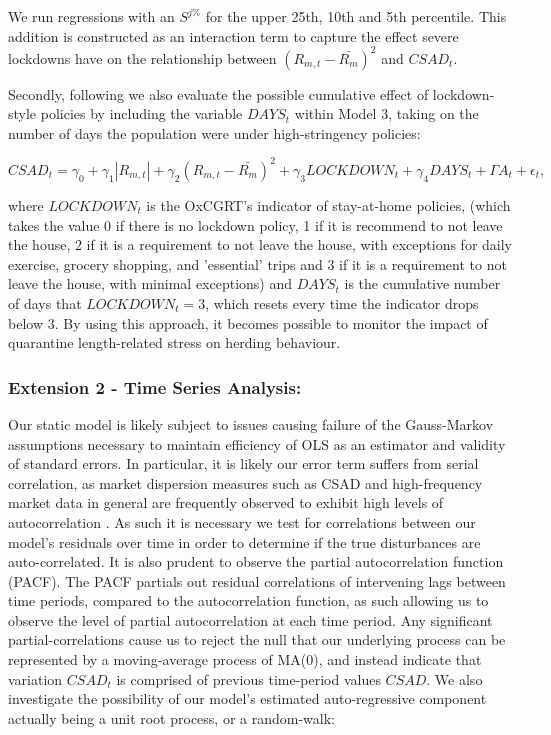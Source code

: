 \documentclass[12pt]{article}
\numberwithin{table}{section}   %
\begin{document}
We run regressions with an $S^{j\%}$ for the upper 25th, 10th and 5th percentile. This addition is constructed as an interaction term to capture the effect severe lockdowns have on the relationship between $(R_{m,t}-\bar{R_m})^2$ and $CSAD_t$.

Secondly, following \citet{aknin} we also evaluate the possible cumulative effect of lockdown-style policies by including the variable $DAYS_t$ within Model 3, taking on the number of days the population were under high-stringency policies:

\begin{equation}\label{model-4}
CSAD_t=\gamma_0+\gamma_1 |R_{m,t}|+\gamma_2 (R_{m,t}-\bar{R_m})^2+\gamma_3LOCKDOWN_t+\gamma_4DAYS_t+\Gamma{A}_t+\epsilon_t,
\end{equation}

where $LOCKDOWN_t$ is the OxCGRT's indicator of stay-at-home policies, (which takes the value 0 if there is no lockdown policy, 1 if it is recommend to not leave the house, 2 if it is a requirement to not leave the house, with exceptions for daily exercise, grocery shopping, and 'essential' trips and 3 if it is a requirement to not leave the house, with minimal exceptions) and $DAYS_t$ is the cumulative number of days that $LOCKDOWN_t = 3$, which resets every time the indicator drops below 3. By using this approach, it becomes possible to monitor the impact of quarantine length-related stress \citep{brooks} on herding behaviour.

\subsubsection*{Extension 2 - Time Series Analysis:}

Our static model is likely subject to issues causing failure of the Gauss-Markov assumptions necessary to maintain efficiency of OLS as an estimator and validity of standard errors. In particular, it is likely our error term suffers from serial correlation, as market dispersion measures such as CSAD and high-frequency market data in general are frequently observed to exhibit high levels of autocorrelation \citep{cck}. As such it is necessary we test for correlations between our model’s residuals over time in order to determine if the true disturbances are auto-correlated. It is also prudent to observe the partial autocorrelation function (PACF). The PACF partials out residual correlations of intervening lags between time periods, compared to the autocorrelation function, as such allowing us to observe the level of partial autocorrelation at each time period. Any significant partial-correlations cause us to reject the null that our underlying process can be represented by a moving-average process of MA(0), and instead indicate that variation $CSAD_t$ is comprised of previous time-period values $CSAD$. We also investigate the possibility of our model’s estimated auto-regressive component actually being a unit root process, or a random-walk:
\end{document}
